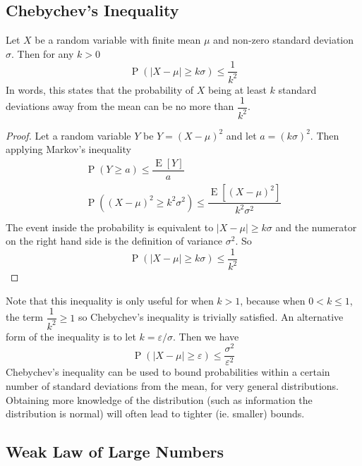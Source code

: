 \documentclass[11pt]{report} %
\begin{document}
\subsection{Chebychev's Inequality}

Let $X$ be a random variable with finite mean $\mu$ and non-zero standard deviation $\sigma$. Then for any $k > 0$
\begin{equation}
\operatorname{P}\left(\left|X - \mu\right| \geq k\sigma\right) \leq \dfrac{1}{k^{2}}
\end{equation}
In words, this states that the probability of $X$ being at least $k$ standard deviations away from the mean can be no more than $\dfrac{1}{k^{2}}$.
\begin{proof}
Let a random variable $Y$ be $Y = \left(X - \mu\right)^{2}$ and let $a = \left(k\sigma\right)^{2}$. Then applying Markov's inequality
\begin{gather}
\operatorname{P}\left(Y \geq a\right) \leq \dfrac{\operatorname{E}\left[Y\right]}{a} \\
\operatorname{P}\left(\left(X - \mu\right)^{2} \geq k^{2}\sigma^{2}\right) \leq \dfrac{\operatorname{E}\left[\left(X - \mu\right)^{2}\right]}{k^{2}\sigma^{2}} \\
\end{gather}
The event inside the probability is equivalent to $\left|X - \mu\right| \geq k\sigma$ and the numerator on the right hand side is the definition of variance $\sigma^{2}$. So
\begin{equation}
\operatorname{P}\left(\left|X - \mu\right| \geq k\sigma\right) \leq \dfrac{1}{k^{2}}
\end{equation}
\end{proof}
Note that this inequality is only useful for when $k > 1$, because when $0 < k \leq 1$, the term $\dfrac{1}{k^{2}} \geq 1$ so Chebychev's inequality is trivially satisfied. An alternative form of the inequality is to let $k = \varepsilon/\sigma$. Then we have
\begin{equation}
\operatorname{P}\left(\left|X - \mu\right| \geq \varepsilon\right) \leq \dfrac{\sigma^{2}}{\varepsilon^{2}}
\end{equation}
Chebychev's inequality can be used to bound probabilities within a certain number of standard deviations from the mean, for very general distributions. Obtaining more knowledge of the distribution (such as information the distribution is normal) will often lead to tighter (ie. smaller) bounds.

\subsection{Weak Law of Large Numbers}
\end{document}
